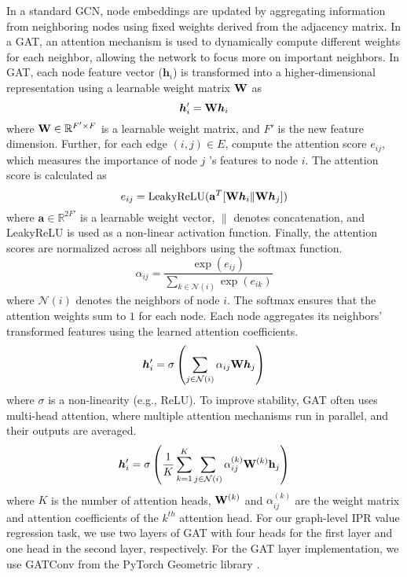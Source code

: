 \documentclass[aps, prd, showpacs, floatfix, superscriptaddress, twocolumn, nofootinbib, preprintnumbers, longbibliography]{revtex4-2}
\begin{document}
In a standard GCN, node embeddings are updated by aggregating information from neighboring nodes using fixed weights derived from the adjacency matrix. In a GAT, an attention mechanism is used to dynamically compute different weights for each neighbor, allowing the network to focus more on important neighbors. In GAT, each node feature vector ($\bm{h}_i$) is transformed into a higher-dimensional representation using a learnable weight matrix ${\bf W}$ as
\begin{equation}\nonumber
\bm{h}_i' = {\bf W} \bm{h}_i  
\end{equation}
where \( {\bf W} \in \mathbb{R}^{F' \times F} \) is a learnable weight matrix, and \( F' \) is the new feature dimension. Further, for each edge \( (i, j) \in E \), compute the attention score \( e_{ij} \), which measures the importance of node \( j \) 's features to node \( i \). The attention score is calculated as
\[
e_{ij} = \text{LeakyReLU}(\mathbf{a}^T [ {\bf W} \bm{h}_i \| {\bf W} \bm{h}_j ])
\]
where \( \mathbf{a} \in \mathbb{R}^{2F'} \) is a learnable weight vector, \( \| \) denotes concatenation, and LeakyReLU is used as a non-linear activation function. Finally, the attention scores are normalized across all neighbors using the softmax function.
\[
\alpha_{ij} = \frac{\exp(e_{ij})}{\sum_{k \in \mathcal{N}(i)} \exp(e_{ik})}
\]
where \( \mathcal{N}(i) \) denotes the neighbors of node \( i \). The softmax ensures that the attention weights sum to $1$ for each node. Each node aggregates its neighbors' transformed features using the learned attention coefficients.
\[
\bm{h}_i' = \sigma \left( \sum_{j \in \mathcal{N}(i)} \alpha_{ij} {\bf W} \bm{h}_j \right)
\]
where \( \sigma \) is a non-linearity (e.g., ReLU). To improve stability, GAT often uses multi-head attention, where multiple attention mechanisms run in parallel, and their outputs are averaged.
\[
\bm{h}_i' = \sigma \left( \frac{1}{K} \sum_{k=1}^{K} \sum_{j \in \mathcal{N}(i)} \alpha_{ij}^{(k)} {\bf W}^{(k)} \mathbf{h}_j \right)
\]
where $K$ is the number of attention heads,  ${\bf W}^{(k)}$ and $\alpha_{ij}^{(k)}$ are the weight matrix and attention coefficients of the $k^{th}$ attention head. For our graph-level IPR value regression task, we use two layers of GAT with four heads for the first layer and one head in the second layer, respectively. For the GAT layer implementation, we use GATConv from the PyTorch Geometric library \cite{FeyLenssen2019}.
\end{document}

